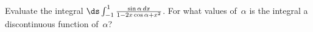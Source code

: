 Evaluate the integral $\ds\int_{-1}^{1} \frac{\sin\alpha\, dx}{1 - 2x\cos\alpha + x^{2}}$. For what values of~$\alpha$ is
the integral a discontinuous function of~$\alpha$? 

